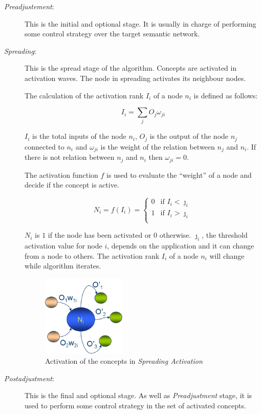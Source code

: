 \documentclass{llncs}
\begin{document}
\begin{description}
\item [\textit{Preadjustement}:] This is the initial and optional stage. It is usually in charge
of performing some control strategy over the target semantic network.
\medskip

\item [\textit{Spreading}:] This is the spread stage of the algorithm. Concepts
are activated in activation waves. The node in spreading activates its neighbour
nodes.
\medskip

The calculation of the activation rank $I_i$ of a node $n_i$ is defined as
follows:

\begin{equation}
I_i  = \sum_j{O_j \omega_{ji}}
\end{equation}
\medskip

$I_i$ is the total inputs of the node $n_i$, $O_j$
is the output of the node $n_j$ connected to $n_i$ and $\omega_{ji}$
is the weight of the relation between $n_j$ and $n_i$. 
If there is not relation between $n_j$ and $n_i$ then
$\omega_{ji} = 0$. 


The activation function $f$ is used to evaluate the ``weight'' of a node and
decide if the concept is active.


\begin{equation}
N_i=f(I_i)=\begin{cases} 0 & \text{if $I_i < \jmath_i$} \\ 1 &
\text{if $I_i > \jmath_i$}
\\ \end{cases}
\end{equation}


$N_i$ is $1$ if the node has been activated or 0 otherwise. 
$\jmath_i$, the threshold activation value for node $i$, depends on the application
and it can change from a node to others. The activation rank $I_i$ of a
node $n_i$ will change while algorithm iterates.

\begin{figure}[h]
 \centering
 \includegraphics[width=4cm]{images/modelo-sa}
    \caption{Activation of the concepts in \textit{Spreading Activation}}
 \label{fig:modelo-sa}
\end{figure}

\item [\textit{Postadjustment}:] This is the final and optional stage. As well as
\textit{Preadjustment} stage, it is used to perform some control strategy in the
set of activated concepts.

\end{description}
\end{document}
